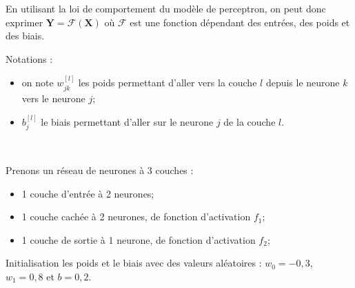 \begin{defi}[Couches]
En utilisant la loi de comportement du modèle de perceptron, on peut donc exprimer $\mathbf{Y}=\mathcal{F}\left(\mathbf{X}\right)$ 
où $\mathcal{F}$ est une fonction dépendant des entrées, des poids et des biais.


Notations : 
\begin{itemize}
\item on note $w^{[l]}_{jk}$ les poids permettant d'aller vers la couche $l$ depuis le neurone $k$ vers le neurone $j$;
\item $b^{[l]}_{j}$ le biais permettant d'aller sur le neurone $j$ de la couche $l$.
\end{itemize}
\end{defi}


\begin{exemple}~\\

\begin{minipage}[c]{.4\linewidth}

Prenons un réseau de neurones à 3 couches : 
\begin{itemize}
\item 1 couche d'entrée à 2 neurones;
\item 1 couche cachée à 2 neurones, de fonction d'activation $f_1$;
\item 1 couche de sortie à 1 neurone, de fonction d'activation $f_2$; 
\end{itemize}

Initialisation les poids et le biais avec des valeurs aléatoires : $w_0 = -0,3$, $w_1 = 0,8$ et $b=0,2$.




\end{minipage}
\end{exemple}
